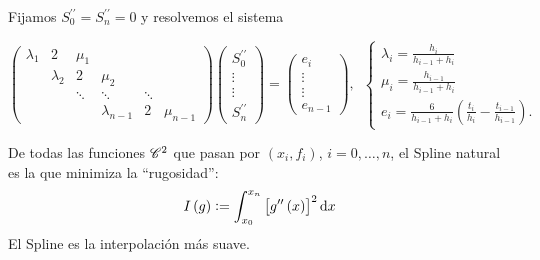 \begin{obs}
    Fijamos $S^{\prime\prime}_0=S^{\prime\prime}_n=0$ y resolvemos el sistema

    \[
        \begin{pmatrix}
            \lambda_1   & 2 & \mu_1 & \\
            & \lambda_2 & 2 & \mu_2 & & \\
            & & \ddots    & \ddots & \ddots & \\
            & & & \lambda_{n-1} & 2 & \mu_{n-1} 
        \end{pmatrix}
        \begin{pmatrix}
            S^{\prime\prime}_0 \\
            \vdots \\
            \vdots \\
            S^{\prime\prime}_n
        \end{pmatrix}
        =
        \begin{pmatrix}
            e_i \\
            \vdots \\
            \vdots \\
            e_{n-1}
        \end{pmatrix}
        ,\,\,\,
        \begin{cases}
            \lambda_i = \frac{h_i}{h_{i-1} + h_i} \\
            \mu_i = \frac{h_{i-1}}{h_{i-1}+h_i} \\
            e_i = \frac{6}{h_{i-1} + h_i}\left( \frac{t_i}{h_{i}} - \frac{t_{i-1}}{h_{i-1}} \right).
        \end{cases}
    \]
\end{obs}

\begin{teo}
    De todas las funciones $\mathscr{C}^2$ que pasan por $\left( x_i, f_i \right)$, $i=0,\dots,n$, el Spline natural es la que minimiza la ``rugosidad'':
    \[
        I\left( g \right) := \int_{x_0}^{x_n} \left[ g^{\prime\prime}\left( x \right) \right]^2 \dif x
    \]
    El Spline es la interpolación más suave.
\end{teo}

